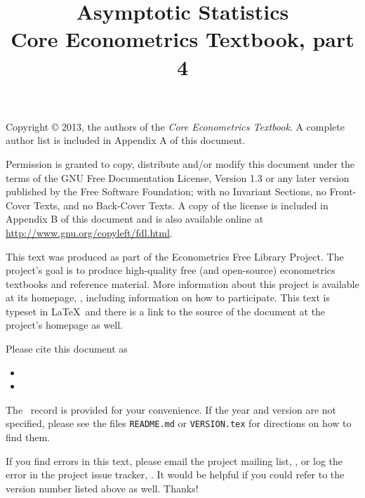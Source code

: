 \documentclass[nohyper]{external/tufte-handout}
\title[Asymptotic statistics]%
{Asymptotic Statistics \\
  Core Econometrics Textbook, part 4}
\begin{document}
\maketitle

\bigskip\noindent%
Copyright © 2013, the authors of the \textit{Core Econometrics Textbook}.
A complete author list is included in Appendix A of this document.

Permission is granted to copy, distribute and/or modify this document
under the terms of the GNU Free Documentation License, Version 1.3 or
any later version published by the Free Software Foundation; with no
Invariant Sections, no Front-Cover Texts, and no Back-Cover Texts.  A
copy of the license is included in Appendix B of this document and is
also available online at \url{http://www.gnu.org/copyleft/fdl.html}.

This text was produced as part of the Econometrics Free Library
Project.  The project's goal is to produce high-quality free (and
open-source) econometrics textbooks and reference material.  More
information about this project is available at its homepage,
\homepage, including information on how
to participate.  This text is typeset in \LaTeX\ and there is a link
to the source of the document at the project's homepage as well.

Please cite this document as
\begin{itemize}
\item[] 
\item[] 
\end{itemize}
The \BibTeX\ record is provided for your convenience.
If the year and version are not specified, please see the files
\texttt{README.md} or \texttt{VERSION.tex} for directions on how to
find them.

If you find errors in this text, please email the project mailing
list, \maillist, or log the error in the project issue tracker,
\bugtrack.  It would be helpful if you could refer to the version
number listed above as well.  Thanks!

\tableofcontents










\end{document}
